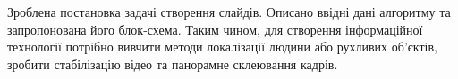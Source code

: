 \chapterConclusion

Зроблена постановка задачі створення слайдів. Описано ввідні 
дані алгоритму та запропонована його блок-схема. 
Таким чином, для створення інформаційної технології 
потрібно вивчити методи локалізації людини або рухливих об'єктів,
зробити стабілізацію відео та панорамне склеювання кадрів. 